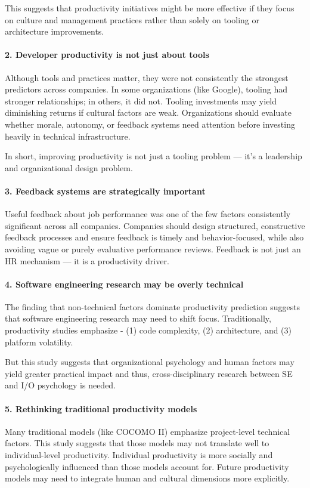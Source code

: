 This suggests that productivity initiatives might be more effective if they focus on culture and management practices rather than solely on tooling or architecture improvements.

\paragraph{2. Developer productivity is not just about tools}
Although tools and practices matter, they were not consistently the strongest predictors across companies. In some organizations (like Google), tooling had stronger relationships; in others, it did not. Tooling investments may yield diminishing returns if cultural factors are weak. Organizations should evaluate whether morale, autonomy, or feedback systems need attention before investing heavily in technical infrastructure.

In short, improving productivity is not just a tooling problem — it's a leadership and organizational design problem.

\paragraph{3. Feedback systems are strategically important}
Useful feedback about job performance was one of the few factors consistently significant across all companies. Companies should design structured, constructive feedback processes and ensure feedback is timely and behavior-focused, while also avoiding vague or purely evaluative performance reviews. Feedback is not just an HR mechanism — it is a productivity driver.

\paragraph{4. Software engineering research may be overly technical}
The finding that non-technical factors dominate productivity prediction suggests that software engineering research may need to shift focus. Traditionally, productivity studies emphasize - (1) code complexity, (2) architecture, and (3) platform volatility.

But this study suggests that organizational psychology and human factors may yield greater practical impact and thus, cross-disciplinary research between SE and I/O psychology is needed.

\paragraph{5. Rethinking traditional productivity models}
Many traditional models (like COCOMO II) emphasize project-level technical factors. This study suggests that those models may not translate well to individual-level productivity. Individual productivity is more socially and psychologically influenced than those models account for. Future productivity models may need to integrate human and cultural dimensions more explicitly.